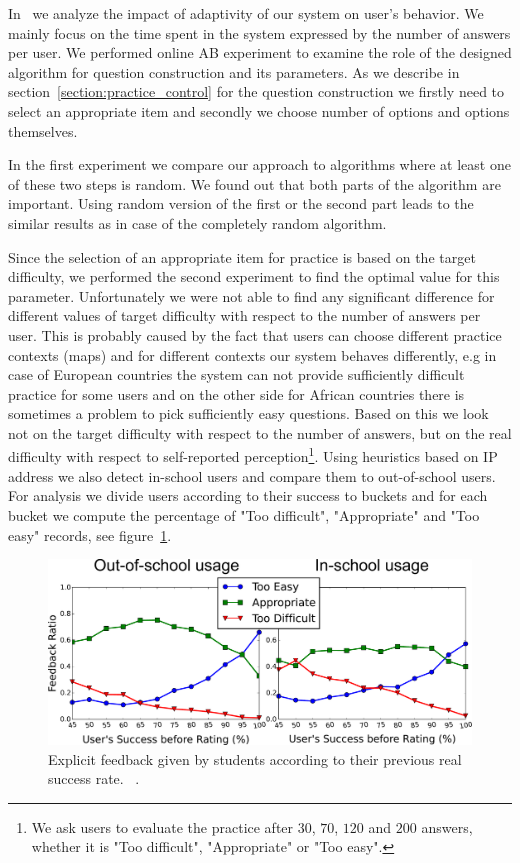 \documentclass[table,color,cover,twoside,nolot,nolof]{fithesis3/fithesis3}
\begin{document}
In~\cite{papousek2015impact} we analyze the impact of adaptivity of our system
on user's behavior. We mainly focus on the time spent in the system expressed
by the number of answers per user. We performed online AB experiment to examine
the role of the designed algorithm for question construction and its
parameters. As we describe in section~\ref{section:practice_control} for the
question construction we firstly need to select an appropriate item and secondly
we choose number of options and options themselves.

In the first experiment we compare our approach to algorithms where at least
one of these two steps is random. We found out that both parts of the algorithm
are important. Using random version of the first or the second part leads to
the similar results as in case of the completely random algorithm.

Since the selection of an appropriate item for practice is based on the target
difficulty, we performed the second experiment to find the optimal value for
this parameter. Unfortunately we were not able to find any significant
difference for different values of target difficulty with respect to the number
of answers per user. This is probably caused by the fact that users can choose
different practice contexts (maps) and for different contexts our system
behaves differently, e.g in case of European countries the system can not
provide sufficiently difficult practice for some users and on the other side
for African countries there is sometimes a problem to pick sufficiently easy
questions. Based on this we look not on the target difficulty with respect to
the number of answers, but on the real difficulty with respect to self-reported
perception\footnote{We ask users to evaluate the practice after $30$, $70$,
$120$ and $200$ answers, whether it is "Too difficult", "Appropriate" or "Too
easy".}. Using heuristics based on IP address we also detect in-school users
and compare them to out-of-school users. For analysis we divide users according
to their success to buckets and for each bucket we compute the percentage of
"Too difficult", "Appropriate" and "Too easy" records, see
figure~\ref{figure:feedback_by_success}.

\begin{figure}[h]
	\begin{center}
		\includegraphics[width=\textwidth]{figure/feedback_by_success_overview}
		\caption{Explicit feedback given by students according to their previous
			real success rate. ~\cite{papousek2015impact}.}
		\label{figure:feedback_by_success}
	\end{center}
\end{figure}
\end{document}
